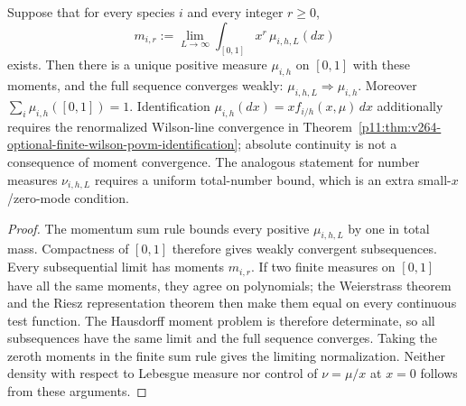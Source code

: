 \documentclass[12pt,a4paper]{article}
\begin{document}
\begin{theorem}
\label{p11:thm:hausdorff-pdf-moment-limit}
Suppose that for every species \(i\) and every integer \(r\ge0\),
\begin{equation}
\label{p11:eq:hausdorff-moment-convergence}
m_{i,r}:=\lim_{L\to\infty}\int_{[0,1]}x^r\,\mu_{i,h,L}(dx)
\end{equation}
exists.  Then there is a unique positive measure \(\mu_{i,h}\) on \([0,1]\)
with these moments, and the full sequence converges weakly:
\(\mu_{i,h,L}\Rightarrow\mu_{i,h}\).  Moreover
\(\sum_i\mu_{i,h}([0,1])=1\).  Identification
\(\mu_{i,h}(dx)=x f_{i/h}(x,\mu)\,dx\) additionally requires the renormalized
Wilson-line convergence in Theorem~\ref{p11:thm:v264-optional-finite-wilson-povm-identification};
absolute continuity is not a consequence of moment convergence.  The analogous
statement for number measures \(\nu_{i,h,L}\) requires a uniform total-number
bound, which is an extra small-\(x\)/zero-mode condition.
\end{theorem}
\begin{proof}
The momentum sum rule bounds every positive \(\mu_{i,h,L}\) by one in total
mass.  Compactness of \([0,1]\) therefore gives weakly convergent subsequences.
Every subsequential limit has moments \(m_{i,r}\).  If two finite measures on
\([0,1]\) have all the same moments, they agree on polynomials; the Weierstrass
theorem and the Riesz representation theorem then make them equal on every
continuous test function.  The Hausdorff moment problem is therefore
determinate, so all subsequences have the same limit and the full sequence
converges.  Taking the zeroth moments in the finite sum rule gives the limiting
normalization.  Neither density with respect to Lebesgue measure nor control of
\(\nu=\mu/x\) at \(x=0\) follows from these arguments.
\end{proof}
\end{document}
